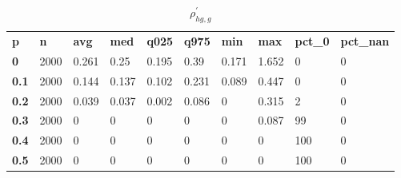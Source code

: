 \begin{table}[h]
 \centering 
\footnotesize
\caption{$\rho_{hg,g}^\prime $}
\label{tab:alphahgg}
\begin{tabular}[h]{| l l l l l l l l l l|
    } \hline
\textbf{ p} & \textbf{ n} & \textbf{ avg} & \textbf{ med} & \textbf{ q025} & \textbf{ q975} & \textbf{ min} & \textbf{ max} & \textbf{ pct\_0} & \textbf{ pct\_nan}
           \\
  \textbf{  0} & 2000 & 0.261 &  0.25 & 0.195 &  0.39 & 0.171 & 1.652 &   0 & 0
           \\
  \textbf{0.1} & 2000 & 0.144 & 0.137 & 0.102 & 0.231 & 0.089 & 0.447 &   0 & 0
           \\
  \textbf{0.2} & 2000 & 0.039 & 0.037 & 0.002 & 0.086 &     0 & 0.315 &   2 & 0
           \\
  \textbf{0.3} & 2000 &     0 &     0 &     0 &     0 &     0 & 0.087 &  99 & 0
           \\
  \textbf{0.4} & 2000 &     0 &     0 &     0 &     0 &     0 &     0 & 100 & 0
           \\
  \textbf{0.5} & 2000 &     0 &     0 &     0 &     0 &     0 &     0 & 100 & 0
           \\
 \hline \end{tabular}
 \end{table}
